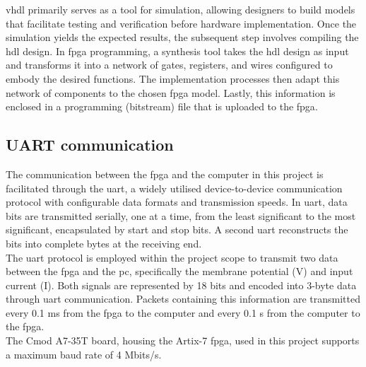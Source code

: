 \acrshort{vhdl} primarily serves as a tool for simulation, allowing designers to build models that facilitate testing and verification before hardware implementation. Once the simulation yields the expected results, the subsequent step involves compiling the \acrshort{hdl} design. In \acrshort{fpga} programming, a synthesis tool takes the \acrshort{hdl} design as input and transforms it into a network of gates, registers, and wires configured to embody the desired functions. The implementation processes then adapt this network of components to the chosen \acrshort{fpga} model. Lastly, this information is enclosed in a programming (bitstream) file that is uploaded to the \acrshort{fpga}.\\

\subsection{UART communication}
The communication between the \acrshort{fpga} and the 
computer in this project is facilitated through 
the \acrfull{uart}, a widely utilised device-to-device 
communication protocol with configurable data 
formats and transmission speeds. In \acrshort{uart}, data 
bits are transmitted serially, one at a time, 
from the least significant to the most significant, 
encapsulated by start and stop bits. A second \acrshort{uart} 
reconstructs the bits into complete bytes at the 
receiving end.\\
The \acrshort{uart} protocol is employed within the project 
scope to transmit two data between the \acrshort{fpga} and the 
\acrfull{pc}, specifically the membrane potential (V) and 
input current (I). Both signals are represented 
by 18 bits and encoded into 3-byte data through 
\acrshort{uart} communication. Packets containing this 
information are transmitted every 0.1 ms from 
the \acrshort{fpga} to the computer and every 0.1 s from 
the computer to the \acrshort{fpga}.\\
The Cmod A7-35T board, housing the Artix-7 \acrshort{fpga}, 
used in this project supports a maximum baud 
rate of 4 Mbits/s.
